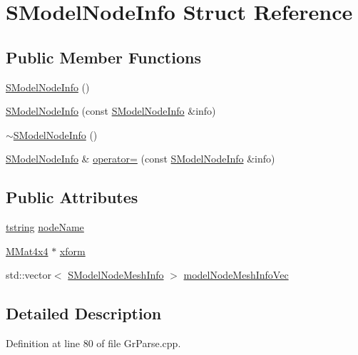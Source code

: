 \hypertarget{struct_s_model_node_info}{
\section{SModelNodeInfo Struct Reference}
\label{struct_s_model_node_info}
}
\subsection*{Public Member Functions}
\begin{CompactItemize}
\item 
\hyperlink{struct_s_model_node_info_7eafefb03fe7aaee5d2cd235140b9b89}{SModelNodeInfo} ()
\item 
\hyperlink{struct_s_model_node_info_3d47c8ef34c6a2936deabb0759c51f01}{SModelNodeInfo} (const \hyperlink{struct_s_model_node_info}{SModelNodeInfo} \&info)
\item 
\hyperlink{struct_s_model_node_info_b9a91b477ee9cce04d7651b195ab3c34}{$\sim$SModelNodeInfo} ()
\item 
\hyperlink{struct_s_model_node_info}{SModelNodeInfo} \& \hyperlink{struct_s_model_node_info_ffc051915ca9fb7eab93269b2504aaac}{operator=} (const \hyperlink{struct_s_model_node_info}{SModelNodeInfo} \&info)
\end{CompactItemize}
\subsection*{Public Attributes}
\begin{CompactItemize}
\item 
\hyperlink{common__afx_8h_816fa58fd77499b0edb2c69ebe803d5c}{tstring} \hyperlink{struct_s_model_node_info_02679f64cd6fbb25ea3aa422f475161f}{nodeName}
\item 
\hyperlink{class_m_mat4x4}{MMat4x4} $\ast$ \hyperlink{struct_s_model_node_info_3d23e4e63314a9d0115a4fd1c84a14a1}{xform}
\item 
std::vector$<$ \hyperlink{struct_s_model_node_mesh_info}{SModelNodeMeshInfo} $>$ \hyperlink{struct_s_model_node_info_ca20ee9540ca1d18dc8e7f2a1aa2bdbe}{modelNodeMeshInfoVec}
\end{CompactItemize}


\subsection{Detailed Description}


Definition at line 80 of file GrParse.cpp.

